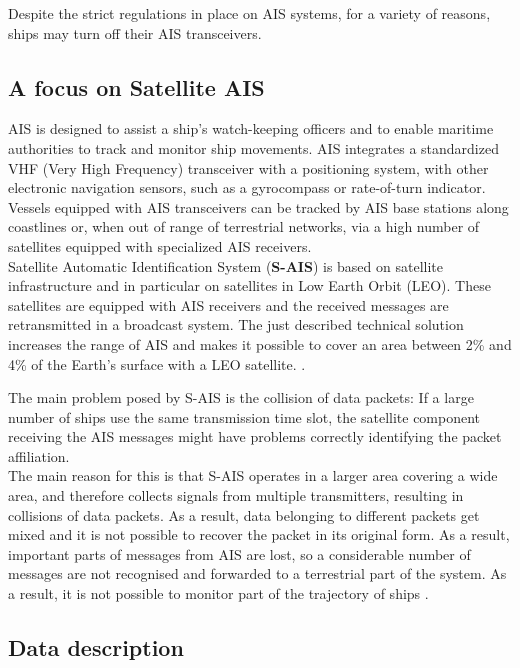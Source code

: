     Despite the strict regulations in place on AIS systems, for a variety of reasons, ships may turn off their AIS transceivers.
    
    \subsection{A focus on Satellite AIS}
    AIS is designed to assist a ship's watch-keeping officers and to enable maritime authorities to track and monitor ship movements. AIS integrates a standardized VHF (Very High Frequency) transceiver with a positioning system, with other electronic navigation sensors, such as a gyrocompass or rate-of-turn indicator. Vessels equipped with AIS transceivers can be tracked by AIS base stations along coastlines or, when out of range of terrestrial networks, via a high number of satellites equipped with specialized AIS receivers. 
    \\
    Satellite Automatic Identification System (\textbf{S-AIS}) is based on satellite infrastructure and in particular on satellites in Low Earth Orbit (LEO). These satellites are equipped with AIS receivers and the received messages are retransmitted in a broadcast system.
    The just described technical solution increases the range of AIS and makes it possible to cover an area between 2\% and 4\% of the Earth's surface with a LEO satellite. \cite{dbscan_ais}.
    
    The main problem posed by S-AIS is the collision of data packets: If a large number of ships use the same transmission time slot, the satellite component receiving the AIS messages might have problems correctly identifying the packet affiliation.
    \\
    The main reason for this is that S-AIS operates in a larger area covering a wide area, and therefore collects signals from multiple transmitters, resulting in collisions of data packets.
    As a result, data belonging to different packets get mixed and it is not possible to recover the packet in its original form. As a result, important parts of messages from AIS are lost, so a considerable number of messages are not recognised and forwarded to a terrestrial part of the system. As a result, it is not possible to monitor part of the trajectory of ships \cite{dbscan_ais}.

    \subsection{Data description}


